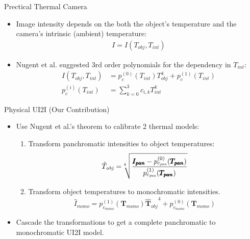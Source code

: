 \begin{frame}{Prectical Thermal Camera}
  \begin{itemize}
    \item Image intensity depends on the both the object's temperature and the camera's intrinsic (ambient) temperature:
    \begin{equation}
      \begin{split}            
          I = I(T_\mathit{obj}, T_\mathit{int})
      \end{split}
    \end{equation}
    \item Nugent et al. \cite{10.1117/1.OE.52.6.061304} suggested 3rd order polynomials for the dependency in $T_\mathit{int}$:
    \begin{equation} \label{eq:IntensityVsTemperatures}
      \begin{split}            
        I(T_\mathit{obj}, T_\mathit{int}) &= p^{(0)}_c(T_\mathit{int}) T^4_\mathit{obj} + p^{(1)}_c(T_\mathit{int})\\
        p^{(i)}_c(T_\mathit{int}) &= \sum_{k=0}^3  c_{i,k} T_\mathit{int}^k
    \end{split}
    \end{equation}
  \end{itemize}
\end{frame}

\begin{frame}{Physical UI2I (Our Contribution)}
  \begin{itemize} 
    \item Use Nugent et al.'s theorem to calibrate 2 thermal models:
    \begin{enumerate}
      \item Transform panchromatic intensities to object temperatures:
      \begin{equation*}
        \hat{T}_\mathit{obj} = \sqrt[\leftroot{5} 4]{\frac{\pmb{I_\mathit{pan}} - p^{(0)}_{c_\mathit{pan}}(\pmb{T_\mathit{pan}})}{p^{(1)}_{c_\mathit{pan}}(\pmb{T_\mathit{pan}})}}
      \end{equation*}
      \item Transform object temperatures to monochromatic intensities.
      \begin{equation*}
        \hat{I}_\mathit{mono} = p^{(1)}_{c_\mathit{mono}}(\pmb{T_\mathit{mono}}) \pmb{\hat{T}_\mathit{obj}}^4 + p^{(0)}_{c_\mathit{mono}}(\pmb{T_\mathit{mono}})
      \end{equation*}
    \end{enumerate}
    \item Cascade the transformations to get a complete panchromatic to monochromatic UI2I model.
  \end{itemize}
\end{frame}

